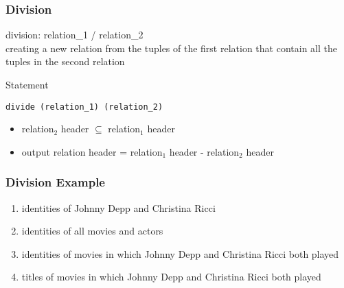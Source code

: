 \documentclass[dvipsnames]{beamer}
\theoremstyle{plain}
\begin{document}
\begin{frame}[fragile]
  \frametitle{Division}

  \begin{definition}
    \alert{division}: relation\_1 / relation\_2\\
      creating a new relation from the tuples of the first relation
      that contain all the tuples in the second relation
  \end{definition}

  \pause
  \begin{block}{Statement}
    \begin{lstlisting}
divide (relation_1) (relation_2)
    \end{lstlisting}
  \end{block}

  \pause
  \begin{itemize}
    \item relation$_2$ header $\subseteq$ relation$_1$ header

    \pause
    \item output relation header = relation${_1}$ header - relation${_2}$
      header
  \end{itemize}
\end{frame}

\begin{frame}
  \frametitle{Division Example}

  \begin{example}
    \pause
    \begin{enumerate}
      \item identities of Johnny Depp and Christina Ricci

      \pause
      \item identities of all movies and actors

      \pause
      \item identities of movies in which Johnny Depp and Christina Ricci
        both played

      \pause
      \item titles of movies in which Johnny Depp and Christina Ricci both
        played
    \end{enumerate}
  \end{example}
\end{frame}
\end{document}

